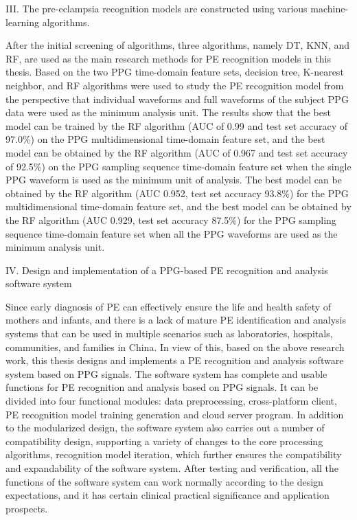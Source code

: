 III. The pre-eclampsia recognition models are constructed using various machine-learning algorithms.

After the initial screening of algorithms, three algorithms, namely DT, KNN, and RF, are used as the main research methods 
for PE recognition models in this thesis. Based on the two PPG time-domain feature sets, decision tree, K-nearest neighbor, and RF algorithms were 
used to study the PE recognition model from the perspective that individual waveforms and full waveforms of the subject PPG data were used as the minimum analysis unit. 
The results show that the best model can be trained by the RF algorithm (AUC of 0.99 and test set accuracy of 97.0\%) on the PPG multidimensional time-domain 
feature set, and the best model can be obtained by the RF algorithm (AUC of 0.967 and test set accuracy of 92.5\%) on the PPG sampling sequence time-domain 
feature set when the single PPG waveform is used as the minimum unit of analysis. The best model can be obtained by the RF algorithm (AUC 0.952, 
test set accuracy 93.8\%) for the PPG multidimensional time-domain feature set, and the best model can be obtained by the RF algorithm (AUC 0.929, 
test set accuracy 87.5\%) for the PPG sampling sequence time-domain feature set when all the PPG waveforms are used as the minimum analysis unit.

IV. Design and implementation of a PPG-based PE recognition and analysis software system

Since early diagnosis of PE can effectively ensure the life and health safety of mothers and infants, and there is a lack of 
mature PE identification and analysis systems that can be used in multiple scenarios such as laboratories, hospitals, communities, 
and families in China.
In view of this, based on the above research work, this thesis designs and implements a PE recognition and analysis software system 
based on PPG signals. The software system has complete and usable functions for PE recognition and analysis based on PPG signals.
It can be divided into four functional modules: data preprocessing, cross-platform client, PE recognition model training generation 
and cloud server program.
In addition to the modularized design, the software system also carries out a number of compatibility design, supporting a variety 
of changes to the core processing algorithms, recognition model iteration, which further ensures the compatibility and expandability 
of the software system.
After testing and verification, all the functions of the software system can work normally according to the design expectations, 
and it has certain clinical practical significance and application prospects.

